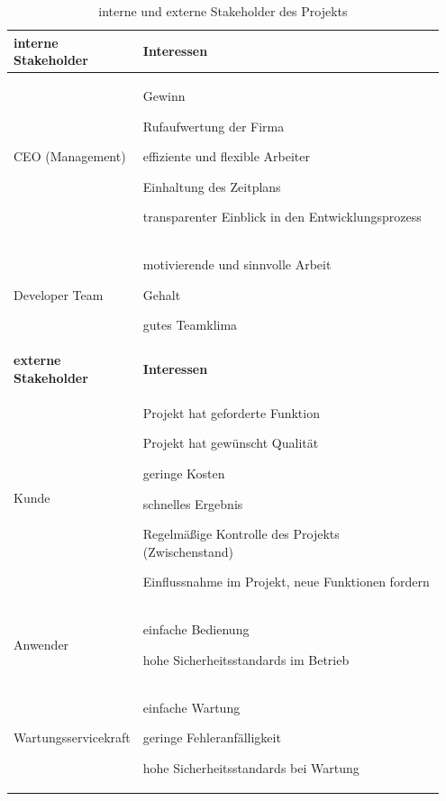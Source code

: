\documentclass[
   draft=false
  ,paper=a4
  ,twoside=true
  ,fontsize=11pt
  ,headsepline
  ,DIV11
  ,parskip=full+
]{scrartcl} %
\begin{document}
\begin{table}[htp]
\center
\caption[Stakeholder]{interne und externe Stakeholder des Projekts}
\label{tab:stakeholder}
\begin{tabular}{|p{0.25\linewidth}| p{0.7\linewidth} |}
	\hline 
	\rowcolor{tabgrey} 
	\textbf{interne Stakeholder} &
		\textbf{Interessen} \\ \hline
	CEO (Management) &
	\begin{compactitem}[-]
    \item Gewinn
    \item Rufaufwertung der Firma
    \item effiziente und flexible Arbeiter
    \item Einhaltung des Zeitplans
    \item transparenter Einblick in den Entwicklungsprozess
  \end{compactitem} \\ \hline
  
	Developer Team & 
	\begin{compactitem}[-]
	  \item motivierende und sinnvolle Arbeit
    \item Gehalt
    \item gutes Teamklima
  \end{compactitem} \\ \hline
		\rowcolor{tabgrey} 
	\textbf{externe Stakeholder} &
		\textbf{Interessen} \\ \hline
		Kunde &
		\begin{compactitem}[-]
		\item Projekt hat geforderte Funktion
    \item Projekt hat gewünscht Qualität 
    \item geringe Kosten
    \item schnelles Ergebnis
    \item Regelmäßige Kontrolle des Projekts (Zwischenstand)
    \item Einflussnahme im Projekt, neue Funktionen fordern
  \end{compactitem} \\ \hline
	Anwender & 
	\begin{compactitem}[-]
    \item einfache Bedienung
    \item hohe Sicherheitsstandards im Betrieb
  \end{compactitem} \\ \hline 
	Wartungsservicekraft & 
	\begin{compactitem}[-]
    \item einfache Wartung
    \item geringe Fehleranfälligkeit
    \item hohe Sicherheitsstandards bei Wartung 
  \end{compactitem} \\ \hline
\end{tabular}		
\end{table}
\end{document}

